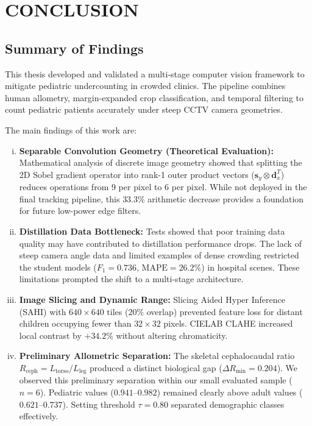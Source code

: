\chapter{CONCLUSION}

\section{Summary of Findings}
This thesis developed and validated a multi-stage computer vision framework to mitigate pediatric undercounting in crowded clinics. The pipeline combines human allometry, margin-expanded crop classification, and temporal filtering to count pediatric patients accurately under steep CCTV camera geometries.

The main findings of this work are:
\begin{enumerate}[(i)]
    \item \textbf{Separable Convolution Geometry (Theoretical Evaluation):} Mathematical analysis of discrete image geometry showed that splitting the 2D Sobel gradient operator into rank-1 outer product vectors ($\mathbf{s}_y \otimes \mathbf{d}_x^T$) reduces operations from 9 per pixel to 6 per pixel. While not deployed in the final tracking pipeline, this $33.3\%$ arithmetic decrease provides a foundation for future low-power edge filters.
    \item \textbf{Distillation Data Bottleneck:} Tests showed that poor training data quality may have contributed to distillation performance drops. The lack of steep camera angle data and limited examples of dense crowding restricted the student models ($F_1 = 0.736$, $\text{MAPE} = 26.2\%$) in hospital scenes. These limitations prompted the shift to a multi-stage architecture.
    \item \textbf{Image Slicing and Dynamic Range:} Slicing Aided Hyper Inference (SAHI) with $640 \times 640$ tiles ($20\%$ overlap) prevented feature loss for distant children occupying fewer than $32 \times 32$ pixels. CIELAB CLAHE increased local contrast by $+34.2\%$ without altering chromaticity.
    \item \textbf{Preliminary Allometric Separation:} The skeletal cephalocaudal ratio $R_{\text{ceph}} = L_{\text{torso}}/L_{\text{leg}}$ produced a distinct biological gap ($\Delta R_{\min} = 0.204$). We observed this preliminary separation within our small evaluated sample ($n=6$). Pediatric values ($0.941\text{--}0.982$) remained clearly above adult values ($0.621\text{--}0.737$). Setting threshold $\tau = 0.80$ separated demographic classes effectively.

\end{enumerate}
